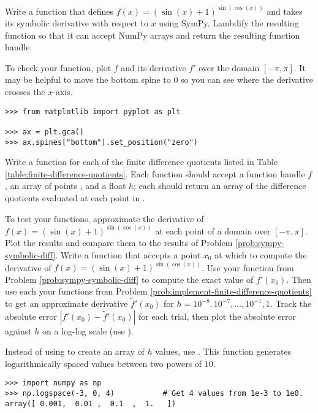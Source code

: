 
Write a function that defines $f(x) = (\sin(x) + 1)^{\sin(\cos(x))}$ and takes its symbolic derivative with respect to $x$ using SymPy.
Lambdify the resulting function so that it can accept NumPy arrays and return the resulting function handle.

To check your function, plot $f$ and its derivative $f'$ over the domain $[-\pi, \pi]$.
It may be helpful to move the bottom spine to $0$ so you can see where the derivative crosses the $x$-axis.
\begin{lstlisting}
>>> from matplotlib import pyplot as plt

>>> ax = plt.gca()
>>> ax.spines["bottom"].set_position("zero")
\end{lstlisting}
\label{prob:sympy-symbolic-diff}
Write a function for each of the finite difference quotients listed in Table \ref{table:finite-difference-quotients}.
Each function should accept a function handle $f$, an array of points , and a float $h$; each should return an array of the difference quotients evaluated at each point in .

To test your functions, approximate the derivative of $f(x) = (\sin(x) + 1)^{\sin(\cos(x))}$ at each point of a domain over $[-\pi,\pi]$.
Plot the results and compare them to the results of Problem \ref{prob:sympy-symbolic-diff}.
\label{prob:implement-finite-difference-quotients}
Write a function that accepts a point $x_0$ at which to compute the derivative of $f(x) = (\sin(x)+1)^{\sin(\cos(x))}$.
Use your function from Problem \ref{prob:sympy-symbolic-diff} to compute the exact value of $f'(x_0)$.
Then use each your functions from Problem \ref{prob:implement-finite-difference-quotients} to get an approximate derivative $\tilde{f}'(x_0)$ for $h=10^{-8},10^{-7},\ldots,10^{-1},1$.
Track the absolute error $|f'(x_0) - \tilde{f}'(x_0)|$ for each trial, then plot the absolute error against $h$ on a log-log scale (use ).

Instead of using  to create an array of $h$ values, use .
This function generates logarithmically spaced values between two powers of $10$.
\begin{lstlisting}
>>> import numpy as np
>>> np.logspace(-3, 0, 4)           # Get 4 values from 1e-3 to 1e0.
array([ 0.001,  0.01 ,  0.1  ,  1.   ])
\end{lstlisting}


